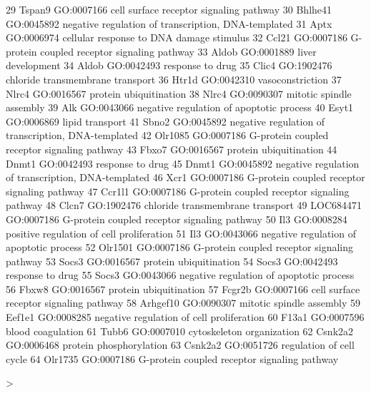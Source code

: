 \documentclass[12pt]{article}
\begin{document}
\begin{Schunk}
\begin{Soutput}
29      Tspan9 GO:0007166             cell surface receptor signaling pathway
30     Bhlhe41 GO:0045892 negative regulation of transcription, DNA-templated
31        Aptx GO:0006974            cellular response to DNA damage stimulus
32       Ccl21 GO:0007186        G-protein coupled receptor signaling pathway
33       Aldob GO:0001889                                   liver development
34       Aldob GO:0042493                                    response to drug
35       Clic4 GO:1902476                    chloride transmembrane transport
36       Htr1d GO:0042310                                    vasoconstriction
37       Nlrc4 GO:0016567                              protein ubiquitination
38       Nlrc4 GO:0090307                            mitotic spindle assembly
39         Alk GO:0043066            negative regulation of apoptotic process
40       Esyt1 GO:0006869                                     lipid transport
41       Sbno2 GO:0045892 negative regulation of transcription, DNA-templated
42     Olr1085 GO:0007186        G-protein coupled receptor signaling pathway
43       Fbxo7 GO:0016567                              protein ubiquitination
44       Dnmt1 GO:0042493                                    response to drug
45       Dnmt1 GO:0045892 negative regulation of transcription, DNA-templated
46        Xcr1 GO:0007186        G-protein coupled receptor signaling pathway
47      Ccr1l1 GO:0007186        G-protein coupled receptor signaling pathway
48       Clcn7 GO:1902476                    chloride transmembrane transport
49   LOC684471 GO:0007186        G-protein coupled receptor signaling pathway
50         Il3 GO:0008284           positive regulation of cell proliferation
51         Il3 GO:0043066            negative regulation of apoptotic process
52     Olr1501 GO:0007186        G-protein coupled receptor signaling pathway
53       Socs3 GO:0016567                              protein ubiquitination
54       Socs3 GO:0042493                                    response to drug
55       Socs3 GO:0043066            negative regulation of apoptotic process
56       Fbxw8 GO:0016567                              protein ubiquitination
57      Fcgr2b GO:0007166             cell surface receptor signaling pathway
58    Arhgef10 GO:0090307                            mitotic spindle assembly
59      Eef1e1 GO:0008285           negative regulation of cell proliferation
60       F13a1 GO:0007596                                   blood coagulation
61       Tubb6 GO:0007010                           cytoskeleton organization
62     Csnk2a2 GO:0006468                             protein phosphorylation
63     Csnk2a2 GO:0051726                            regulation of cell cycle
64     Olr1735 GO:0007186        G-protein coupled receptor signaling pathway
\end{Soutput}
\begin{Sinput}
> 
\end{Sinput}
\end{Schunk}
\end{document}
